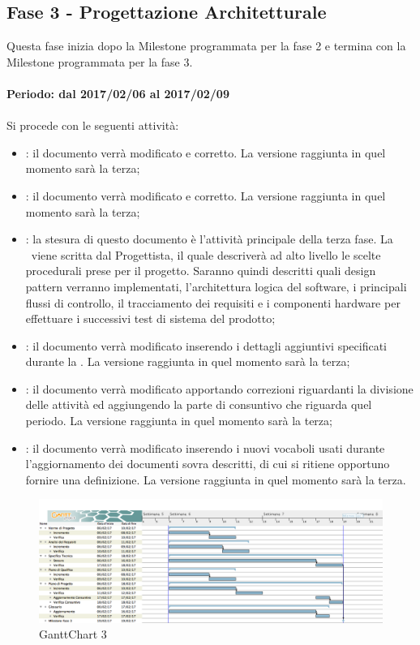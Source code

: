 \documentclass[../PianoDiProgetto.tex]{subfiles}
\begin{document}
	\subsection{Fase 3 - Progettazione Architetturale}
	Questa fase inizia dopo la Milestone programmata per la fase 2 e termina con la Milestone programmata per la fase 3.
	\\
	\\
	\textbf{Periodo: dal 2017/02/06 al 2017/02/09}
	\\
	\\
	Si procede con le seguenti attività:
	\begin{itemize}
		\item \normediprogetto: il documento verrà modificato e corretto. La versione raggiunta in quel momento sarà la terza;
		\item \analisideirequisiti: il documento verrà modificato e corretto. La versione raggiunta in quel momento sarà la terza;
		\item \specificatecnica: la stesura di questo documento è l'attività principale della terza fase. La \specificatecnica\ viene scritta dal Progettista, il quale descriverà ad alto livello le scelte procedurali prese per il progetto. Saranno quindi descritti quali design pattern verranno implementati, l'architettura logica del software, i principali flussi di controllo, il tracciamento dei requisiti e i componenti hardware per effettuare i successivi test di sistema del prodotto;
		\item \pianodiqualifica: il documento verrà modificato inserendo i dettagli aggiuntivi specificati durante la \revisionedeirequisiti. La versione raggiunta in quel momento sarà la terza;
		\item \pianodiprogetto: il documento verrà modificato apportando correzioni riguardanti la divisione delle attività ed aggiungendo la parte di consuntivo che riguarda quel periodo. La versione raggiunta in quel momento sarà la terza;
		\item \glossario: il documento verrà modificato inserendo i nuovi vocaboli usati durante l'aggiornamento dei documenti sovra descritti, di cui si ritiene opportuno fornire una definizione. La versione raggiunta in quel momento sarà la terza.
	\end{itemize}
	
	\begin{figure}[!h]
		\centering
		\includegraphics[width=\textwidth]{Pianificazione/Immagini/GanttChart03.png}
		\caption{GanttChart 3}
	\end{figure}	
	
\end{document}
